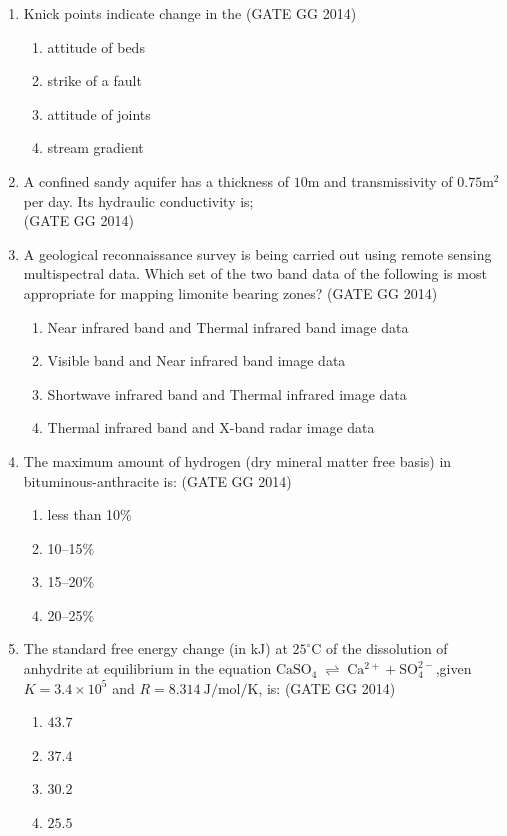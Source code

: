 \documentclass[journal]{IEEEtran}
\begin{document}
\begin{enumerate}[start=1]
\item Knick points indicate change in the 
\hfill(GATE GG 2014)
\begin{enumerate}
    \item attitude of beds
    \item strike of a fault
    \item attitude of joints
    \item stream gradient 
\end{enumerate}

\item A confined sandy aquifer has a thickness of $10$m and transmissivity of $0.75$m$^2$per day. Its hydraulic conductivity is;\\
\hspace*{15.7cm}(GATE GG 2014)

\vspace{0.5cm}

\item A geological reconnaissance survey is being carried out using remote sensing multispectral data. Which set of the two band data of the following is most appropriate for mapping limonite bearing zones? 
\hfill(GATE GG 2014)
\begin{enumerate}
    \item Near infrared band and Thermal infrared band image data 
\item  Visible band and Near infrared band image data 
\item  Shortwave infrared band and Thermal infrared image data 
\item  Thermal infrared band and X-band radar image data
\end{enumerate}

\item The maximum amount of hydrogen (dry mineral matter free basis) in bituminous-anthracite is:  
\hfill(GATE GG 2014)
\begin{multicols}{2}
   \begin{enumerate}
       \item less than 10\% 
\item  10--15\% 
\item  15--20\% 
\item  20--25\%
\end{enumerate}
\end{multicols}

\item The standard free energy change (in kJ) at \( 25^\circ \mathrm{C} \) of the dissolution of anhydrite at equilibrium in the equation $\mathrm{CaSO_4 \; \rightleftharpoons \; Ca^{2+} + SO_4^{2-}}$,given \( K = 3.4 \times 10^5 \) and \( R = 8.314 \ \mathrm{J/mol/K} \), is:
\hfill(GATE GG 2014)
\begin{multicols}{4}
    \begin{enumerate}
    \item $43.7$
    \item $37.4$
    \item $30.2$
    \item $25.5$
\end{enumerate}
\end{multicols}


\end{enumerate}
\end{document}
